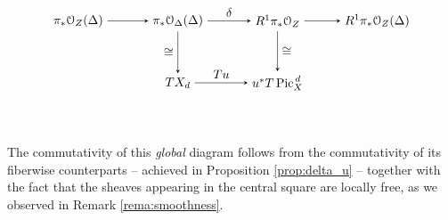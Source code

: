 		$$
		\begin{tikzpicture}[node distance=8em, auto]
			\node (A) 									{$\pi_* \calO_Z(\Delta)$};
			\node (B) 	[right of=A]		{$\pi_* \calO_\Delta(\Delta)$};
		  \node (C) 	[right of=B] 	{$R^1 \pi_* \calO_Z$};
		  \node (D) 	[right of=C] 	{$R^1 \pi_* \calO_Z(\Delta)$};
		  \node (A') 	[below of=A] 		{$\;$};
		  \node (B') 	[below of=B, yshift=3em] 		{$ T \Dd$};
		  \node (C') 	[below of=C, yshift=3em] 		{$ u^* T \Pd $};
		  \node (D') 	[below of=D] 		{$\;$};
		  \draw[-stealth]					(A)		to node {} (B);
		  \draw[-stealth]					(B)		to node {$\delta$} (C);
		  \draw[-stealth]					(C)		to node {} (D);
		  \draw[-stealth]					(B')	to node {$\Tu$} (C');
		  \draw[-stealth][swap]		(B)		to node {$\cong$} (B');
		  \draw[-stealth]					(C)		to node {$\cong$} (C');
		\end{tikzpicture}
		\vspace{-2em}
		$$

		The commutativity of this \emph{global} diagram follows from the commutativity of its fiberwise counterparts -- achieved in Proposition \ref{prop:delta_u} -- together with the fact that the sheaves appearing in the central square are locally free, as we observed in Remark \ref{rema:smoothness}.




